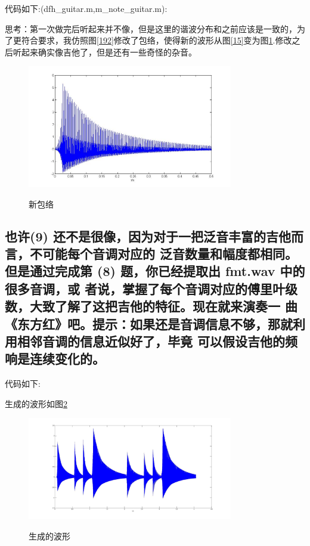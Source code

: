 \documentclass{ctexart}
\begin{document}
        代码如下:(dfh\_guitar.m,m\_note\_guitar.m):

        
        

        思考：第一次做完后听起来并不像，但是这里的谐波分布和之前应该是一致的，为了更符合要求，我仿照图\ref{192}修改了包络，使得新的波形从图\ref{15}变为图\ref{110}.修改之后听起来确实像吉他了，但是还有一些奇怪的杂音。
        \begin{figure}
            \centering
            \includegraphics[width=0.8\textwidth]{fmt/1_10.jpg}\\
            \caption{新包络\label{110}}
        \end{figure}

    \subsection{
            也许(9) 还不是很像，因为对于一把泛音丰富的吉他而言，不可能每个音调对应的
            泛音数量和幅度都相同。但是通过完成第 (8) 题，你已经提取出 fmt.wav 中的很多音调，或
            者说，掌握了每个音调对应的傅里叶级数，大致了解了这把吉他的特征。现在就来演奏一
            曲《东方红》吧。提示：如果还是音调信息不够，那就利用相邻音调的信息近似好了，毕竟
            可以假设吉他的频响是连续变化的。
        }        

        代码如下:
        

        生成的波形如图\ref{111}
        \begin{figure}
            \centering
            \includegraphics[width=0.8\textwidth]{fmt/1_11.jpg}\\
            \caption{生成的波形\label{111}}
        \end{figure}
\end{document}
